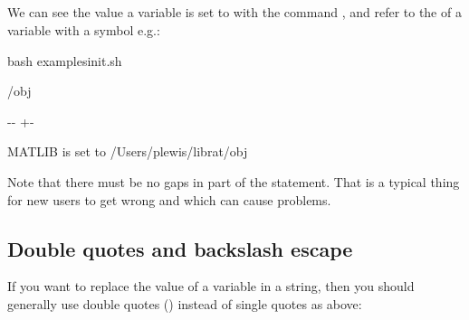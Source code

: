 \documentclass[letterpaper,10pt,english]{sphinxmanual}
\newlength\nbsphinxcodecellspacing
\begin{document}
\subsection{}
\label{\detokenize{Appendix1:echo}}
We can see the value a variable is set to with the command , and refer to the  of a variable with a \sphinxcode{\sphinxupquote{\$}} symbol e.g.:

{
\begin{sphinxVerbatim}[commandchars=\\\{\}]
\llap{\color{nbsphinxin}[2]:\,\hspace{\fboxrule}\hspace{\fboxsep}}\PYGZpc{}\PYGZpc{}bash
 examples\PYGZus{}init.sh

 /obj
 
\end{sphinxVerbatim}
}

{

\kern-\sphinxverbatimsmallskipamount\kern-\baselineskip
\kern+\FrameHeightAdjust\kern-\fboxrule
\vspace{\nbsphinxcodecellspacing}

\begin{sphinxVerbatim}[commandchars=\\\{\}]
MATLIB is set to /Users/plewis/librat/obj
\end{sphinxVerbatim}
}

Note that there must be no gaps in  part of the statement. That is a typical thing for new users to get wrong and which can cause problems.


\subsection{Double quotes  and backslash escape \sphinxstyleliteralintitle{\sphinxupquote{/}}}
\label{\detokenize{Appendix1:Double-quotes-"-and-backslash-escape-/}}
If you want to replace the value of a variable in a string, then you should generally use double quotes () instead of single quotes \sphinxcode{\sphinxupquote{\textquotesingle{}}} as above:
\end{document}
